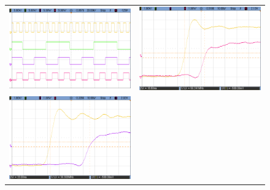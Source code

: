\begin{figure}[H]
    \centering
        \begin{tabular}{c c}
            \includegraphics[scale=0.2]{../EJ7/Mediciones/Osciloscopio/Asincronico/cropped_contador.png} &
            \includegraphics[scale=0.2]{../EJ7/Mediciones/Osciloscopio/Asincronico/cropped_salida_q0.png} \\
            \includegraphics[scale=0.2]{../EJ7/Mediciones/Osciloscopio/Asincronico/cropped_salida_q1.png} &

\end{tabular}
\end{figure}
